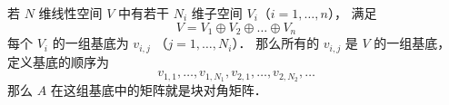 
\begin{issues}
\issueDraft
\end{issues}


若 $N$ 维线性空间 $V$ 中有若干 $N_i$ 维子空间 $V_i$（$i=1,\dots,n$）， 满足
\begin{equation}
V = V_1 \oplus V_2 \oplus \dots \oplus V_n
\end{equation}
每个 $V_i$ 的一组基底为 $v_{i,j}$ （$j=1,\dots,N_i$）． 那么所有的 $v_{i,j}$ 是 $V$ 的一组基底， 定义基底的顺序为
\begin{equation}
v_{1,1},\dots, v_{1,N_1}, v_{2,1}, \dots, v_{2,N_2}, \dots
\end{equation}
那么 $A$ 在这组基底中的矩阵就是块对角矩阵．

